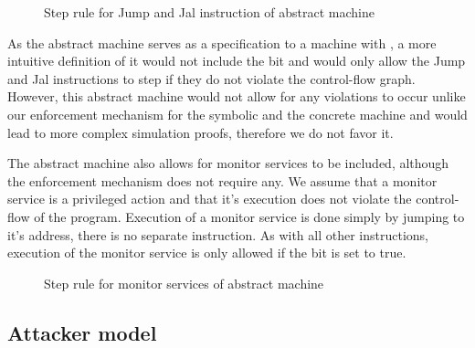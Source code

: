 \begin{figure}[!htpb]
\bigskip

\caption{Step rule for Jump and Jal instruction of abstract machine}
\end{figure}

As the abstract machine serves as a specification to a machine with
\CFI, a more intuitive definition of it would not include the \ok bit
and would only allow the Jump and Jal instructions to step if they do
not violate the control-flow graph. However, this abstract machine
would not allow for any violations to occur unlike our enforcement
mechanism for the symbolic and the concrete machine and would lead to
more complex simulation proofs, therefore we do not favor it.

The abstract machine also allows for monitor services to be included,
although the \CFI enforcement mechanism does not require any. We
assume that a monitor service is a privileged action and that it's
execution does not violate the control-flow of the program. Execution
of a monitor service is done simply by jumping to it's address, there
is no separate instruction. As with all other instructions, execution
of the monitor service is only allowed if the \ok bit is set to true.

\begin{figure}[H]
\caption{Step rule for monitor services of abstract machine}
\end{figure}


\subsection{Attacker model}\label{sec:abstract_attacker}

